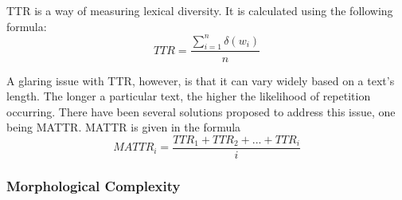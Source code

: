 \documentclass[12pt,a4paper]{article}
\numberwithin{figure}{section}
\numberwithin{table}{section}
\numberwithin{definition}{section}
\begin{document}
TTR is a way of measuring lexical diversity. It is calculated using the following formula: \[TTR = \frac{\sum_{i=1}^{n}\delta(w_i)}{n}\]

A glaring issue with TTR, however, is that it can vary widely based on a text's length. The longer a particular text, the higher the likelihood of repetition occurring. There have been several solutions proposed to address this issue, one being MATTR. MATTR is given in the formula \[MATTR_i = \frac{TTR_1+TTR_2+...+TTR_i}{i}\]

\subsubsection{Morphological Complexity}
\label{ssec:morphologicalcomplexity}

\end{document}
